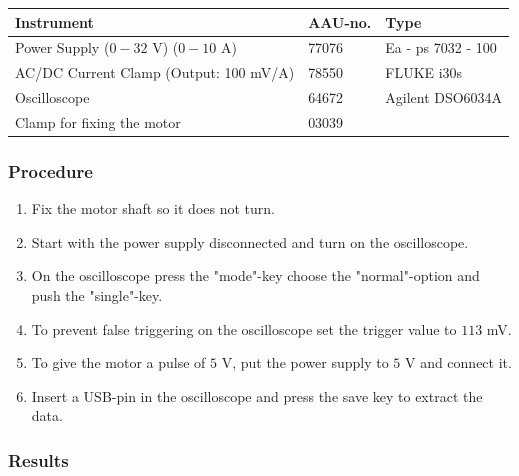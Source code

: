 \begin{table}[H]
\begin{tabular}{|l|l|p{4cm}|}
\hline%
  \textbf{Instrument}                    &  \textbf{AAU-no.}  &  \textbf{Type}       \\
\hline%
  Power Supply ($0 - 32$ V) ($0 - 10$ A) &  77076             &  Ea - ps 7032 - 100  \\
\hline%
  AC/DC Current Clamp (Output: 100 mV/A) &  78550             &  FLUKE i30s          \\
\hline%
  Oscilloscope                           &  64672             &  Agilent DSO6034A    \\
\hline%
  Clamp for fixing the motor             &  03039             &                      \\
\hline%
\end{tabular}
\end{table}

\subsubsection{Procedure}

\begin{enumerate}
  \item Fix the motor shaft so it does not turn.
  \item Start with the power supply disconnected and turn on the oscilloscope.
  \item On the oscilloscope press the "mode"-key choose the "normal"-option and push the "single"-key.
  \item To prevent false triggering on the oscilloscope set the trigger value to $113$ mV.
  \item To give the motor a pulse of $5$ V, put the power supply to $5$ V and connect it.
  \item Insert a USB-pin in the oscilloscope and press the save key to extract the data.
\end{enumerate}

\subsubsection{Results}

